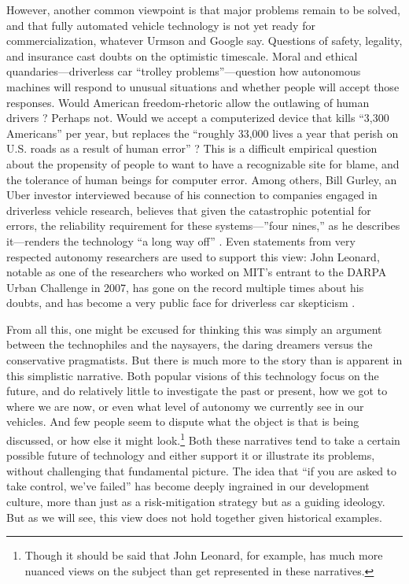 
However, another common viewpoint is that major problems remain to be
solved, and that fully automated vehicle technology is not yet ready for
commercialization, whatever Urmson and Google 
say. Questions of safety, legality, and insurance cast doubts on the
optimistic timescale. Moral and ethical
quandaries---driverless car ``trolley problems''---question how
autonomous machines will respond to unusual situations and whether
people will accept those responses. Would American freedom-rhetoric
allow the outlawing of human drivers \cite{badgerElon}? 
Perhaps not. Would we accept a computerized device that kills ``3,300
Americans'' per year, but replaces the ``roughly 33,000 lives a year
that perish on U.S. roads as a result of human
error'' \cite{mcfarlandDriverless}?
This is a difficult empirical question about the propensity of people
to want to have a recognizable site for blame, and the tolerance of
human beings for computer error. Among others, Bill Gurley, an Uber
investor interviewed because of his connection to companies engaged in
driverless vehicle research, believes that given the
catastrophic potential for errors, the reliability requirement
for these systems---''four nines,'' as he describes it---renders the
technology ``a long way 
off'' \cite{shontellTop}.
Even statements from very respected autonomy researchers are used to
support this view: John Leonard, notable as one of the researchers who
worked on MIT's entrant to the DARPA Urban Challenge in 2007, has gone
on the record multiple times about his doubts, and has become a very
public face for driverless car skepticism \cite{ramseyWhen} \cite{gomesCircles}.

From all this, one might be excused for thinking this was simply an
argument between the technophiles and the naysayers, the daring dreamers versus the
conservative pragmatists. But there is much more to the story than is
apparent in this simplistic narrative. Both popular visions of this
technology focus on the future, and do relatively little to
investigate the past or present, how we got to 
where we are now, or even what level of autonomy we currently see in
our vehicles. And few people seem to dispute what the object is that is
being discussed, or how else it might look.\footnote{Though it should
  be said that John Leonard, for example, has much more nuanced views
  on the subject than get represented in these narratives.} Both these narratives 
tend to take a certain possible future of technology and either support it
or illustrate its problems, without challenging that fundamental
picture. The idea that ``if you are asked to take control, we've
failed'' has become deeply ingrained in our development
culture, more than just as a risk-mitigation strategy but as a guiding
ideology. But as we will see, this view does not hold together given
historical examples.

